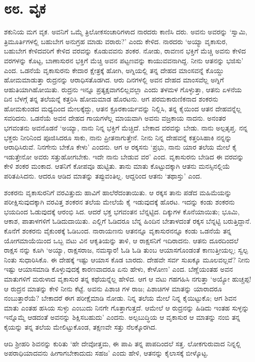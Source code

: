 
\chapter{೮೮. ವೃಕ}

ಶಕುನಿಯ ಮಗ ವೃಕ. ಅವನಿಗೆ ಒಮ್ಮೆ ತ್ರಿಲೋಕಸಂಚಾರಿಗಳಾದ ನಾರದರು ಕಾಣಿಸಿ ದರು. ಅವನು ಅವರನ್ನು ‘ಸ್ವಾಮಿ, ತ್ರಿಮೂರ್ತಿಗಳಲ್ಲಿ ಬಹುಬೇಗ ಅನುಗ್ರಹ ಮಾಡು ವರಾರು?’ ಎಂದು ಕೇಳಿದ. ನಾರದರು ‘ಅಯ್ಯಾ ವೃಕಾಸುರ, ಬಹುಬೇಗ ಕೇಳಿದವರಿಗೆ ಕೇಳಿದ ವರವನ್ನು ಕೊಡುವವನು ಶಂಕರ. ನೋಡು, ರಾವಣನ ಭಕ್ತಿಗೆ ಮೆಚ್ಚಿ ಅವನು ಕೇಳಿದ ವರಗಳನ್ನು ಕೊಟ್ಟ, ಬಾಣಾಸುರನ ಭಕ್ತಿಗೆ ಮೆಚ್ಚಿ ಅವನ ಪಟ್ಟಣವನ್ನು ಕಾಯುವವನಾಗಿದ್ದ. ನೀನು ಆತನನ್ನು ಭಜಿಸು’ ಎಂದ. ಒಡನೆಯೆ ವೃಕಾಸುರನು ಕೇದಾರ ಕ್ಷೇತ್ರಕ್ಕೆ ಹೋಗಿ, ಅಗ್ನಿಯಲ್ಲಿ ತನ್ನ ದೇಹದ ಮಾಂಸವನ್ನೆ ಕೊಯ್ದು ಹೋಮಮಾಡುತ್ತಾ ರುದ್ರನನ್ನು ಆರಾಧಿಸತೊಡಗಿದ. ಆರು ದಿನಗಳಲ್ಲಿ ಅವನ ದೇಹದ ಮಾಂಸವೆಲ್ಲ ಅಗ್ನಿಗೆ ಆಹುತಿಯಾಗಿಹೋಯಿತು. ರುದ್ರನು ಇನ್ನೂ ಪ್ರತ್ಯಕ್ಷವಾಗಲಿಲ್ಲವಲ್ಲಾ ಎಂದು ತಳಮಳ ಗೊಳ್ಳುತ್ತಾ, ಆತನು ಏಳನೆಯ ದಿನ ಬೆಳಗ್ಗೆ ತನ್ನ ತಲೆಯನ್ನೆ ಕತ್ತರಿಸಿ ಹೋಮಮಾಡ ಹೊರಟನು. ಆಗ ಪರಮಕಾರುಣಿಕನಾದ ಶಂಕರನು ಹೋಮಕುಂಡದ ಮಧ್ಯದಿಂದ ಮೇಲಕ್ಕೆದ್ದು, ಆತನ ಕ್ರೂರಕಾರ್ಯವನ್ನು ನಿಲ್ಲಿಸಿ, ತನ್ನ ಕೈಯಿಂದ ಆತನ ದೇಹವನ್ನೆಲ್ಲ ಸವರಿದನು. ಒಡನೆಯೆ ಅವನ ದೇಹದ ಗಾಯಗಳೆಲ್ಲ ಮಾಯವಾಗಿ ಅವನು ವಜ್ರಕಾಯ ನಾದನು. ಅನಂತರ ಭಗವಂತನು ಅವನೊಡನೆ ‘ಅಯ್ಯಾ, ನಾನು ನಿನ್ನ ಭಕ್ತಿಗೆ ಮೆಚ್ಚಿದೆ. ಬೇಕಾದ ವರವನ್ನು ಬೇಡು. ನಾನು ಅಲ್ಪತೃಪ್ತ. ನನ್ನ ಭಕ್ತರು ನೀರಿನಿಂದ ಪೂಜಿಸಿದರೂ ಸಾಕು, ನಾನು ಪ್ರೀತನಾಗುತ್ತೇನೆ. ನೀನು ನಿನ್ನ ದೇಹವನ್ನೆ ಕತ್ತರಿಸಿಹಾಕಿ ನನ್ನನ್ನು ಆರಾಧಿಸಿರುವೆ. ನಿನಗೇನು ಬೇಕೊ ಕೇಳು’ ಎಂದನು. ಆಗ ಆ ರಕ್ಕಸನು ‘ಪ್ರಭು, ನಾನು ಯಾರ ತಲೆಯ ಮೇಲೆ ಕೈ ಇಡುತ್ತೇನೋ ಅವರು ಸತ್ತುಹೋಗಬೇಕು. ಇದೇ ನಾನು ಬೇಡುವ ವರ’ ಎಂದ. ವೃಕಾಸುರನು ಬೇಡಿದ ಈ ವರವನ್ನು ಕೇಳಿ ಶಂಕರ ಮಂಕಾದ. ಆತನಿಗೆ ಕೋಪವೂ ಹುಟ್ಟಿತು. ತಾನು ಮಾತು ಕೊಟ್ಟುದಕ್ಕಾಗಿ ಆತನು ಮನಸ್ಸಿನಲ್ಲಿಯೆ ಪರಿತಪಿಸಿದನು. ಆದರೂ ಆಡಿದ ಮಾತನ್ನು ತಪ್ಪುವಂತಿಲ್ಲ. ಆದ್ದರಿಂದ ಆತನು ‘ತಥಾಸ್ತು’ ಎಂದ.

ಶಂಕರನು ವೃಕಾಸುರನಿಗೆ ವರವಿತ್ತುದು ಹಾವಿಗೆ ಹಾಲೆರೆದಂತಾಯಿತು. ಆ ರಕ್ಕಸ ತಾನು ಪಡೆದ ಮಹಿಮೆಯನ್ನು ಪರೀಕ್ಷಿಸುವುದಕ್ಕಾಗಿ ವರವಿತ್ತ ಶಂಕರನ ತಲೆಯ ಮೇಲೆಯೆ ಕೈ ಇಡುವುದಕ್ಕೆ ಹೊರಟ. ಇದನ್ನು ಕಂಡು ಶಂಕರನು ಭಯದಿಂದ ಓಡುವುದಕ್ಕೆ ಆರಂಭಿ ಸಿದ. ಆದರೆ ಭಕ್ತ ಭಗವಂತನ ಬೆನ್ನಟ್ಟಿದ. ದಿಕ್ಕುಗಳ ಕೊನೆಯಾಯಿತು; ಭೂಮಿ, ಆಕಾಶ, ಪಾತಾಳಗಳಿಗೆ ಓಡಿದುದಾಯಿತು. ಎಲ್ಲಿಗೆ ಓಡಿದರೂ ಬೆನ್ನ ಹಿಂದಿನ ಬೇತಾಳದಂತೆ ರಕ್ಕಸ ಬೆನ್ನಟ್ಟಿ ಬರುತ್ತಿದ್ದಾನೆ. ಕೊನೆಗೆ ಶಂಕರನು ವೈಕುಂಠಕ್ಕೆ ಓಡಿಬಂದ. ನಾರಾಯಣನು ಆತನನ್ನೂ ವೃಕಾಸುರನನ್ನೂ ಕಂಡು ಒಡನೆಯೆ ತನ್ನ ಯೋಗಮಾಯೆಯಿಂದ ಒಬ್ಬ ವಟು ವಿನ ಆಕೃತಿಯನ್ನು ತಾಳಿ, ಆ ರಾಕ್ಷಸನಿಗೆ ಇದಿರಾದನು. ಆತನು ದೂರದಿಂದಲೆ ರಾಕ್ಷಸ ನನ್ನು ಕೂಗಿ ‘ಅಯ್ಯಾ, ರಾಕ್ಷಸರಾಜ, ನಮಸ್ಕಾರ! ಓಡಿ ಓಡಿ ತುಂಬ ಆಯಾಸಗೊಂಡಂತೆ ಕಾಣುತ್ತೀಯಲ್ಲ; ಸ್ವಲ್ಪ ನಿಂತು ಸುಧಾರಿಸಿಕೊ. ಈ ದೇಹಕ್ಕೆ ಇಷ್ಟು ಆಯಾಸ ಕೊಡ ಬಾರದು. ದೇಹವೇ ಸರ್ವ ಸುಖಕ್ಕೂ ಮೂಲವಲ್ಲವೆ? ನೀನು ಇಷ್ಟು ಆಯಾಸಮಾಡಿ ಕೊಳ್ಳುವುದಕ್ಕೆ ಕಾರಣವಾದರೂ ಏನು ಹೇಳು, ಕೇಳೋಣ’ ಎಂದ. ಬೆಣ್ಣೆಯಂತಹ ಅವನ ಮಾತುಗಳಿಗೆ ಮರುಳಾದ ವೃಕಾಸುರ ತನ್ನ ಕಥೆಯನ್ನೆಲ್ಲ ಹೇಳಿದ. ಆಗ ಆ ವಟು ಗಹಗಹಿಸಿ ನಗುತ್ತಾ ‘ಅಯ್ಯೋ ಹುಚ್ಚಪ್ಪ! ಆ ರುದ್ರನ ಮಾತನ್ನು ಕೇಳಿ ನೀನು ಕೆಟ್ಟೆ. ಅವನು ಪಿಶಾಚಿ ಗಳ ರಾಜ; ಪಿಶಾಚಿಗಳ ಮಾತನ್ನು ಯಾರಾದರೂ ನಂಬುತ್ತಾರೆಯೆ? ಬೇಕಾದರೆ ಈಗ ಪರೀಕ್ಷೆಮಾಡಿ ನೋಡು. ನಿನ್ನ ತಲೆಯ ಮೇಲೆ ನಿನ್ನ ಕೈಯಿಟ್ಟುಕೊ; ಆಗ ಶಿವನ ಮಾತು ಎಂತಹ ಹಸಿಯ ಸುಳ್ಳು ಎಂಬುದು ನಿನಗೇ ಗೊತ್ತಾಗುತ್ತದೆ. ಆಮೇಲೆ ಆ ರುದ್ರನನ್ನು ಹಿಡಿದು ಇಂತಹ ಸುಳ್ಳನ್ನು ಇನ್ನೊಮ್ಮೆ ಆಡದಂತೆ ಅವನನ್ನು ಶಿಕ್ಷಿಸಬಹುದು’ ಎಂದನು. ಅಲ್ಪಬುದ್ಧಿಯ ಆ ವೃಕಾಸುರ ಆ ಮಾತನ್ನು ನಂಬಿ ತನ್ನ ಕೈಯನ್ನು ತನ್ನ ತಲೆಯ ಮೇಲಿಟ್ಟುಕೊಂಡ, ತಕ್ಷಣವೇ ಸತ್ತು ನೆಲಕ್ಕೊರಗಿದ.

ಆದಿ ಶ್ರೀಹರಿ ಶಿವನನ್ನು ಕುರಿತು ‘ಹೇ ದೇವೋತ್ತಮ, ಈ ಪಾಪಿ ತನ್ನ ಪಾಪದಿಂದಲೆ ಸತ್ತ. ಲೋಕಗುರುವಾದ ನಿನ್ನಲ್ಲಿ ಅಪರಾಧಿಯಾದವನು ಹೀಗಾಗಬೇಕಾದುದು ಸಹಜ’ ಎಂದು ಹೇಳಿ, ಆತನನ್ನು ಕೈಲಾಸಕ್ಕೆ ಬೀಳ್ಕೊಟ್ಟ.

